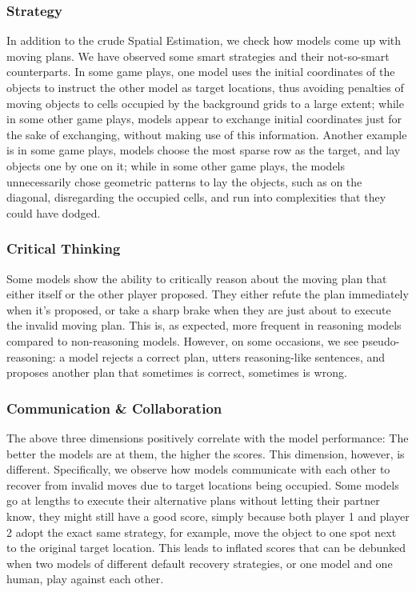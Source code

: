 \documentclass[../main.tex]{subfiles}
\begin{document}
\subsubsection{Strategy}
In addition to the crude Spatial Estimation, we check how models come up with moving plans. We have observed some smart strategies and their not-so-smart counterparts. In some game plays, one model uses the initial coordinates of the objects to instruct the other model as target locations, thus avoiding penalties of moving objects to cells occupied by the background grids to a large extent; while in some other game plays, models appear to exchange initial coordinates just for the sake of exchanging, without making use of this information. Another example is in some game plays, models choose the most sparse row as the target, and lay objects one by one on it; while in some other game plays, the models unnecessarily chose geometric patterns to lay the objects, such as on the diagonal, disregarding the occupied cells, and run into complexities that they could have dodged. 


\subsubsection{Critical Thinking}
Some models show the ability to critically reason about the moving plan that either itself or the other player proposed. They either refute the plan immediately when it's proposed, or take a sharp brake when they are just about to execute the invalid moving plan. This is, as expected, more frequent in reasoning models compared to non-reasoning models. 
However, on some occasions, we see pseudo-reasoning: a model rejects a correct plan, utters reasoning-like sentences, and proposes another plan that sometimes is correct, sometimes is wrong.


\subsubsection{Communication \& Collaboration}
The above three dimensions positively correlate with the model performance: The better the models are at them, the higher the scores. This dimension, however, is different. Specifically, we observe how models communicate with each other to recover from invalid moves due to target locations being occupied. Some models go at lengths to execute their alternative plans without letting their partner know, they might still have a good score, simply because both player 1 and player 2 adopt the exact same strategy, for example, move the object to one spot next to the original target location. This leads to inflated scores that can be debunked when two models of different default recovery strategies, or one model and one human, play against each other. 
\end{document}
